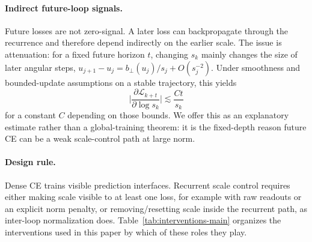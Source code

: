 \paragraph{Indirect future-loop signals.}
Future losses are not zero-signal.
A later loss can backpropagate through the recurrence and therefore depend indirectly on the earlier scale.
The issue is attenuation: for a fixed future horizon $t$, changing $s_k$ mainly changes the size of later angular steps, $u_{j+1}-u_j=b_\perp(u_j)/s_j+O(s_j^{-2})$.
Under smoothness and bounded-update assumptions on a stable trajectory, this yields
\begin{equation}
    \biggl|\frac{\partial \mathcal{L}_{k+t}}{\partial \log s_k}\biggr|
    \lesssim \frac{C t}{s_k}
\end{equation}
for a constant $C$ depending on those bounds.
We offer this as an explanatory estimate rather than a global-training theorem: it is the fixed-depth reason future CE can be a weak scale-control path at large norm.

\paragraph{Design rule.}
Dense CE trains visible prediction interfaces.
Recurrent scale control requires either making scale visible to at least one loss, for example with raw readouts or an explicit norm penalty, or removing/resetting scale inside the recurrent path, as inter-loop normalization does.
Table~\ref{tab:interventions-main} organizes the interventions used in this paper by which of these roles they play.

